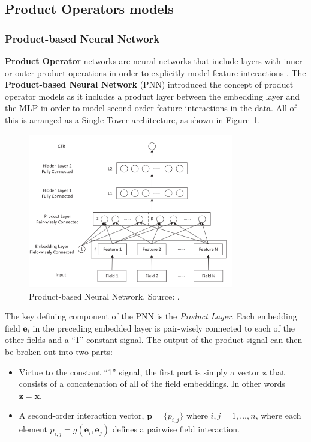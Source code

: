 \documentclass{mldsmsc}
\begin{document}
\subsection{Product Operators models}

\subsubsection{Product-based Neural Network}

\textbf{Product Operator} networks are neural networks that include layers with inner or outer
product operations in order to explicitly model feature interactions \citep{RefWorks:zhang2021deep}.
The \textbf{Product-based Neural Network} (PNN) introduced the concept of product operator models
as it includes a product layer between the embedding layer and the MLP in order to model second
order feature interactions in the data. All of this is arranged as a Single Tower architecture, as shown
in Figure~\ref{fig:pnn}.

\begin{figure}[h]
    \centering
    \includegraphics[width=0.8\textwidth]{../figures/pnn.png}
    \caption{Product-based Neural Network. Source: \citep{RefWorks:qu2016product-based}.}
    \label{fig:pnn}
\end{figure}

The key defining component of the PNN is the \emph{Product Layer}. Each embedding field $\mathbf{e}_i$
in the preceding embedded layer is pair-wisely connected to each of the other fields and a ``1''
constant signal. The output of the product signal can then be broken out into two parts:

\begin{itemize}
    \item Virtue to the constant ``1'' signal, the first part is simply a vector $\mathbf{z}$ that consists of a concatenation
    of all of the field embeddings. In other words $\mathbf{z} = \dot{\mathbf{x}}$.
    \item A second-order interaction vector, $\mathbf{p} = \{p_{i,j}\}\text{ where } i,j = 1, \ldots, n$, where each element
    $p_{i,j} = g(\mathbf{e}_i, \mathbf{e}_j)$ defines a pairwise field interaction.
\end{itemize}
\end{document}
